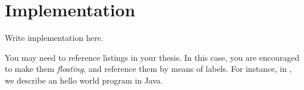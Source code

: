 \chapter{Implementation} %
\label{chap:implementation}

Write implementation here.


You may need to reference listings in your thesis.
%
In this case, you are encouraged to make them \emph{floating}, and reference them by means of labels.
%
For instance, in , we describe an hello world program in Java.
